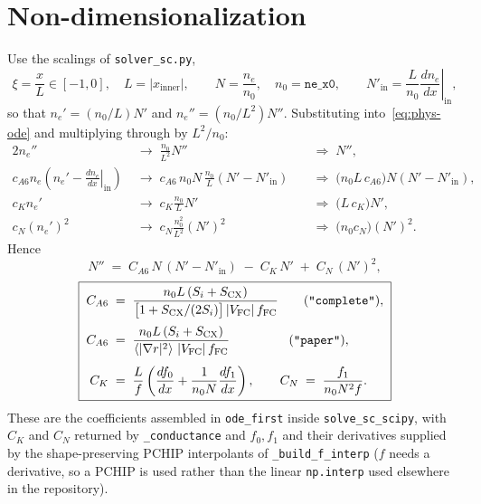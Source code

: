 \documentclass[11pt]{article}
\renewcommand{\ne}{n_{e}}  %
\newcommand{\Vfc}{\lvert V_{\mathrm{FC}}\rvert}
\newcommand{\Si}{S_{i}}
\newcommand{\Scx}{S_{\mathrm{CX}}}
\newcommand{\fFC}{f_{\mathrm{FC}}}
\newcommand{\fsa}[1]{\left\langle #1 \right\rangle}
\newcommand{\gradrsq}{\fsa{|\nabla r|^{2}}}
\newcommand{\dnein}{\left.\frac{d\ne}{dx}\right|_{\mathrm{in}}}
\newcommand{\xin}{x_{\mathrm{inner}}}
\begin{document}
\section{Non-dimensionalization}
\label{sec:nondim}

Use the scalings of \texttt{solver\_sc.py},
\begin{equation}
  \xi = \frac{x}{L}\in[-1,0],\quad L=|\xin|,
  \qquad
  N = \frac{\ne}{n_{0}},\quad n_{0}=\texttt{ne\_x0},
  \qquad
  N'_{\mathrm{in}} = \frac{L}{n_{0}}\dnein,
\end{equation}
so that $\ne' = (n_{0}/L)N'$ and $\ne'' = (n_{0}/L^{2})N''$.  Substituting
into~\eqref{eq:phys-ode} and multiplying through by $L^{2}/n_{0}$:
\begin{alignat}{2}
  \ne'' &\;\to\; \frac{n_{0}}{L^{2}}N''
    &&\;\Longrightarrow\; N'', \\
  c_{A6}\ne(\ne'-\dnein) &\;\to\; c_{A6}\,n_{0}N\,\frac{n_{0}}{L}(N'-N'_{\mathrm{in}})
    &&\;\Longrightarrow\; \bigl(n_{0}L\,c_{A6}\bigr)N(N'-N'_{\mathrm{in}}), \\
  c_{K}\ne' &\;\to\; c_{K}\frac{n_{0}}{L}N'
    &&\;\Longrightarrow\; \bigl(L\,c_{K}\bigr)N', \\
  c_{N}(\ne')^{2} &\;\to\; c_{N}\frac{n_{0}^{2}}{L^{2}}(N')^{2}
    &&\;\Longrightarrow\; \bigl(n_{0}c_{N}\bigr)(N')^{2}.
\end{alignat}
Hence
\begin{equation}
  \boxed{\;
    N'' \;=\; C_{A6}\,N\,(N' - N'_{\mathrm{in}}) \;-\; C_{K}\,N' \;+\; C_{N}\,(N')^{2},
  \;}
\end{equation}
\begin{equation}
  \boxed{\;
  \begin{aligned}
    C_{A6} &\;=\; \frac{n_{0}L\,(\Si+\Scx)}{\bigl[1+\Scx/(2\Si)\bigr]\,\Vfc\,\fFC}
      \qquad\text{(\texttt{"complete"})}, \\[2pt]
    C_{A6} &\;=\; \frac{n_{0}L\,(\Si+\Scx)}{\gradrsq\,\Vfc\,\fFC}
      \qquad\qquad\ \ \text{(\texttt{"paper"})}, \\[4pt]
    C_{K} &\;=\; \frac{L}{f}\left(\frac{df_{0}}{dx} + \frac{1}{n_{0}N}\frac{df_{1}}{dx}\right),
    \qquad
    C_{N} \;=\; \frac{f_{1}}{n_{0}N^{2}f}.
  \end{aligned}
  \;}
\end{equation}
These are the coefficients assembled in \texttt{ode\_first} inside
\texttt{solve\_sc\_scipy}, with $C_{K}$ and $C_{N}$ returned by
\texttt{\_conductance} and $f_{0},f_{1}$ and their derivatives supplied by
the shape-preserving PCHIP interpolants of \texttt{\_build\_f\_interp}
($f$ needs a derivative, so a PCHIP is used rather than the linear
\texttt{np.interp} used elsewhere in the repository).
\end{document}
